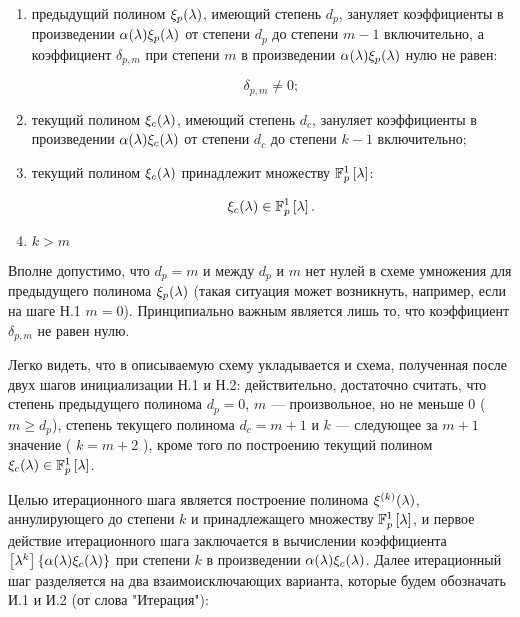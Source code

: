 \begin{conditions} \label{conditions:FPAP:iteration_entrance}
	\begin{enumerate} 
		\item предыдущий полином $\xi_p (\lambda)$, имеющий степень $d_p$, зануляет коэффициенты в произведении
			$\alpha (\lambda) \xi_p (\lambda)$ от степени $d_p$ до степени $m-1$ включительно, а коэффициент $\delta_{p,m}$
			при степени $m$ в произведении $\alpha (\lambda) \xi_p (\lambda)$ нулю не равен:

				$$ \delta_{p,m} \neq 0; $$

		\item текущий полином $\xi_c (\lambda)$, имеющий степень $d_c$, зануляет коэффициенты в произведении
			$\alpha (\lambda) \xi_c (\lambda)$ от степени $d_c$ до степени $k-1$ включительно;

		\item текущий полином $\xi_c (\lambda)$ принадлежит множеству $\mathbb{F}_p^1 \left [ \lambda \right ]$:

			$$ \xi_c (\lambda) \in \mathbb{F}_p^1 \left [ \lambda \right ]. $$

		\item $k > m$
	\end{enumerate}
\end{conditions}

Вполне допустимо, что $d_p = m$ и между $d_p$ и $m$ нет нулей в схеме умножения для предыдущего полинома $\xi_p (\lambda)$ (такая
ситуация может возникнуть, например, если на шаге Н.1 $m=0$). Принципиально важным является лишь то, что коэффициент $\delta_{p,m}$ не равен нулю.

Легко видеть, что в описываемую схему укладывается и схема, полученная после двух шагов инициализации Н.1 и Н.2: действительно, достаточно считать,
что степень предыдущего полинома $d_p = 0$, $m$ --- произвольное, но не меньше 0 ($m \ge d_p$), степень текущего полинома $d_c = m+1$ и
$k$ --- следующее за $m+1$ значение ( $k = m+2$ ), кроме того по построению текущий полином $\xi_c (\lambda) \in \mathbb{F}_p^1 \left [ \lambda \right ]$.

Целью итерационного шага является построение полинома $\xi^{(k)} (\lambda)$, аннулирующего до степени $k$ и принадлежащего
множеству $\mathbb{F}_p^1 \left [ \lambda \right ]$, и первое действие итерационного шага заключается в вычислении коэффициента
$\left [ \lambda^{k} \right ] \left \{ \alpha (\lambda) \xi_c (\lambda) \right \}$ при степени $k$ в произведении $\alpha (\lambda) \xi_c (\lambda)$.
Далее итерационный шаг разделяется на два взаимоисключающих варианта, которые будем обозначать И.1 и И.2 (от слова "Итерация"{}):

